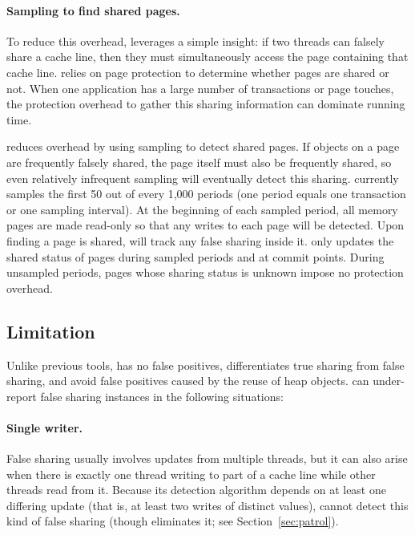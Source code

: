 \paragraph{Sampling to find shared pages.} 
To reduce this overhead, \SheriffDetect{} leverages a
simple insight: if two threads can falsely share a cache line,
then they must simultaneously access the page containing
that cache line. \SheriffDetect{} relies on page protection to determine whether pages are shared or not. When one application has a large number of transactions or page touches, the protection overhead to gather this sharing information can dominate running time.

\SheriffDetect{} reduces overhead by using sampling to detect shared pages. If objects on a page are frequently falsely shared, the page itself must also be frequently shared, so even relatively infrequent sampling will eventually detect this sharing.  \SheriffDetect{} currently samples the first 50 out of every 1,000 periods (one period equals one transaction or one sampling interval). At the beginning of each sampled period, all memory pages are made read-only so that any
writes to each page will be detected. Upon finding a page is
shared, \SheriffDetect{} will track any false sharing inside it. \SheriffDetect{} only updates the shared status of pages during sampled periods and at commit points. During unsampled periods, pages whose sharing status is unknown impose no protection overhead.

\subsection{Limitation}
\label{discussion:faultofdetect}

Unlike previous tools, \SheriffDetect{} has no false positives, differentiates true sharing from false sharing, and avoid false positives caused by the reuse of heap objects.
\SheriffDetect{} can under-report false sharing instances in the following situations:

\paragraph{Single writer.}
False sharing usually involves updates from multiple threads, but it can also arise when there is exactly one thread writing to part of a cache line while other threads read from it. Because its detection algorithm depends on at least one differing update (that is, at least two writes of distinct values), \SheriffDetect{} cannot detect this kind of false sharing (though \sheriffprotect{} eliminates it; see Section~\ref{sec:patrol}).

